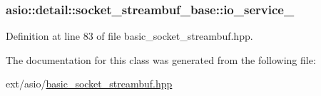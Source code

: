 \subsubsection[{io\+\_\+service\+\_\+}]{ asio\+::detail\+::socket\+\_\+streambuf\+\_\+base\+::io\+\_\+service\+\_\+\hspace{0.3cm}{\ttfamily [protected]}}\label{classasio_1_1detail_1_1socket__streambuf__base_a8743e8a5e39a4d1cc57459ee59306a19}


Definition at line 83 of file basic\+\_\+socket\+\_\+streambuf.\+hpp.



The documentation for this class was generated from the following file\+:\begin{DoxyCompactItemize}
\item 
ext/asio/\hyperlink{basic__socket__streambuf_8hpp}{basic\+\_\+socket\+\_\+streambuf.\+hpp}\end{DoxyCompactItemize}
